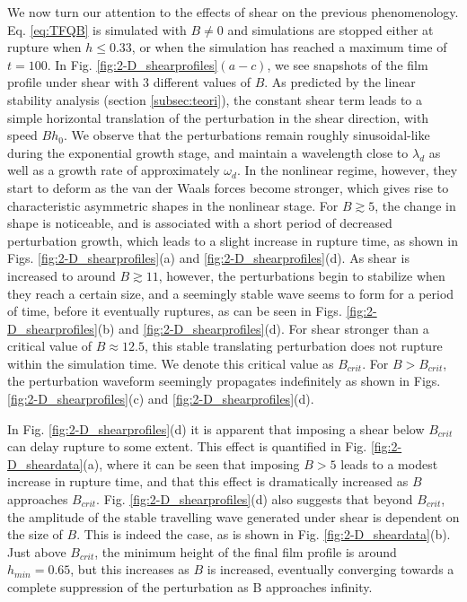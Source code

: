 \documentclass[
 onecolumn,
 amsmath,amssymb,
floatfix,superscriptaddress
]{revtex4-2}
\begin{document}
We now turn our attention to the effects of shear on the previous phenomenology. Eq. \eqref{eq:TFQB} is simulated with $B \neq 0$ and simulations are stopped either at rupture when $h \le 0.33$, or when the simulation has reached a maximum time of $t=100$. In Fig. \ref{fig:2-D_shearprofiles}$(a-c)$, we see snapshots of the film profile under shear with 3 different values of $B$. As predicted by the linear stability analysis (section \ref{subsec:teori}), the constant shear term leads to a simple horizontal translation of the perturbation in the shear direction, with speed $Bh_0$. We observe that the perturbations remain roughly sinusoidal-like during the exponential growth stage, and maintain a wavelength close to $\lambda_d$ as well as a growth rate of approximately $\omega _d$. In the nonlinear regime, however, they start to deform as the van der Waals forces become stronger, which gives rise to characteristic asymmetric shapes in the nonlinear stage. For $B \gtrsim 5$, the change in shape is noticeable, and is associated with a short period of decreased perturbation growth, which leads to a slight increase in rupture time, as shown in Figs. \ref{fig:2-D_shearprofiles}(a) and \ref{fig:2-D_shearprofiles}(d). As shear is increased to around $B \gtrsim 11$, however, the perturbations begin to stabilize when they reach a certain size, and a seemingly stable wave seems to form for a period of time, before it eventually ruptures, as can be seen in Figs. \ref{fig:2-D_shearprofiles}(b) and \ref{fig:2-D_shearprofiles}(d). For shear stronger than a critical value of $B \approx 12.5$, this stable translating perturbation does not rupture within the simulation time. We denote this critical value as $B_{crit}$. For $B > B_{crit}$, the perturbation waveform seemingly propagates indefinitely as shown in Figs. \ref{fig:2-D_shearprofiles}(c) and \ref{fig:2-D_shearprofiles}(d). 

In Fig. \ref{fig:2-D_shearprofiles}(d) it is apparent that imposing a shear below $B_{crit}$ can delay rupture to some extent. This effect is quantified in Fig. \ref{fig:2-D_sheardata}(a), where it can be seen that imposing $B > 5$ leads to a modest increase in rupture time, and that this effect is dramatically increased as $B$ approaches $B_{crit}$. Fig. \ref{fig:2-D_shearprofiles}(d) also suggests that beyond $B_{crit}$, the amplitude of the stable travelling wave generated under shear is dependent on the size of $B$. This is indeed the case, as is shown in Fig. \ref{fig:2-D_sheardata}(b). Just above $B_{crit}$, the minimum height of the final film profile is around $h_{min}=0.65$, but this increases as $B$ is increased, eventually converging towards a complete suppression of the perturbation as B approaches infinity.
\end{document}
